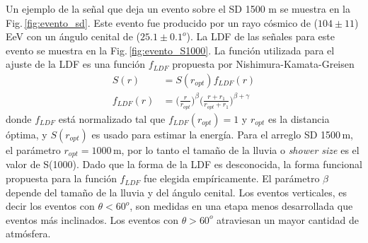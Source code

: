 Un ejemplo de la señal que deja un evento sobre el SD 1500 m se muestra en la Fig.\,\ref{fig:evento_sd}. Este evento fue producido por un rayo cósmico de ($104\pm11$)\,EeV con un ángulo cenital de ($25.1\pm0.1 ^o$). La LDF de las señales para este evento se muestra en la Fig.\,\ref{fig:evento_S1000}. La función utilizada para el ajuste de la LDF es una función  $f_{LDF}$ propuesta por Nishimura-Kamata-Greisen \cite{data}
\begin{align*}
	S(r) &= S(r_{opt})f_{LDF}(r)\\
	f_{LDF}(r)&=\bigg(\frac{r}{r_{opt}}\bigg)^{\beta}\bigg(\frac{r+r_1}{r_{opt}+r_1}\bigg)^{\beta + \gamma}
\end{align*}
donde $f_{LDF}$ está normalizado tal que $f_{LDF}(r_{opt})=1$ y $r_{opt}$ es la distancia óptima, %
y $S(r_{opt})$ es usado para estimar la energía. Para el arreglo SD 1500\,m, el parámetro $r_{opt}=1000\,$m, por lo tanto el tamaño de la lluvia o \emph{shower size} es el valor de S(1000). Dado que la forma de la LDF es desconocida, la forma funcional propuesta para la función $f_{LDF}$ fue elegida empíricamente.  El parámetro $\beta$ depende del tamaño de la lluvia y del ángulo cenital. Los eventos verticales, es decir los eventos con $\theta < 60^o$, son medidas en una etapa menos desarrollada que eventos más inclinados. Los eventos con $\theta>60^o$ atraviesan un mayor cantidad de atmósfera.

